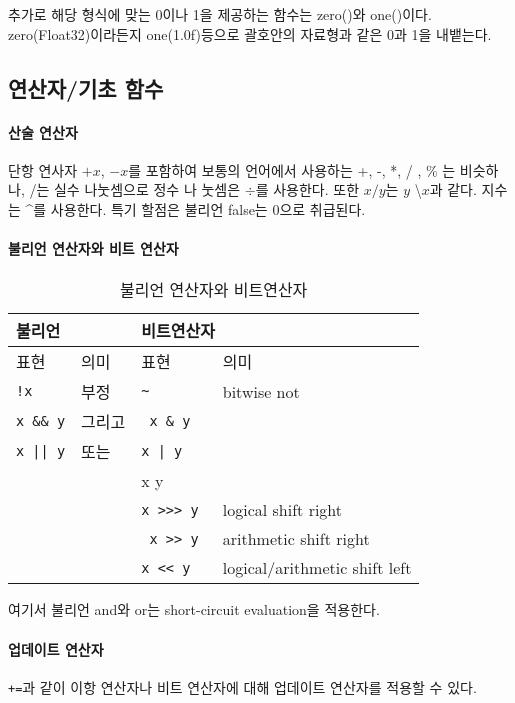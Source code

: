 \documentclass[a4paper, 11pt]{report}
\theoremstyle{definition}
\begin{document}
추가로 해당 형식에 맞는 0이나 1을 제공하는 함수는 zero()와 one()이다. zero(Float32)이라든지 one(1.0f)등으로 괄호안의 자료형과 같은
0과 1을 내뱉는다.

\subsection{연산자/기초 함수}

\paragraph{산술 연산자}
단항 연사자 $+x$, $-x$를 포함하여 보통의 언어에서 사용하는 +, -, *, / , \% 는 비슷하나, /는 실수 나눗셈으로 정수 나
눗셈은 $\div$를 사용한다. 또한 $x/y$는 $y$ \textbackslash $x$과 같다. 지수는 \^{}를 사용한다. 특기 할점은 불리언 false는 0으로 취급된다.

\paragraph{불리언 연산자와 비트 연산자}
\begin{table}
    \begin{tabular}[h]{|l|l|l|l|} \hline
        \multicolumn{2}{|l|}{불리언} & \multicolumn{2}{|l|}{비트연산자} \\ \hline
        표현 &  의미 &  표현 &   의미\\ \hline
        \verb|!x| & 부정 & \verb|~|& bitwise not \\ \hline
        \verb|x && y| & 그리고 & \verb| x & y | & \\ \hline
        \verb[x || y[ & 또는 & \verb[x | y [& \\ \hline
        & & x  y & \\ \hline
        & & \verb|x >>> y| & logical shift right \\ \hline
        & & \verb| x >> y |&  arithmetic shift right \\ \hline
        & & \verb|x << y|  & logical/arithmetic shift left\\ \hline
    \end{tabular}
    \caption{불리언 연산자와 비트연산자} 
\end{table}
여기서 불리언 and와 or는 short-circuit evaluation을 적용한다. 
\paragraph{업데이트 연산자}
\verb|+=|과 같이 이항 연산자나 비트 연산자에 대해 업데이트 연산자를 적용할 수 있다. 
\end{document}
